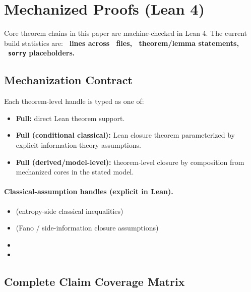 \section*{Mechanized Proofs (Lean 4)}\label{sec:lean}

Core theorem chains in this paper are machine-checked in Lean 4. The current build statistics are:
\textbf{\LeanTotalLines\ lines across \LeanTotalFiles\ files, \LeanTotalTheorems\ theorem/lemma statements, \LeanTotalSorry\ \texttt{sorry} placeholders.}

\subsection*{Mechanization Contract}

Each theorem-level handle is typed as one of:
\begin{itemize}
\item \textbf{Full:} direct Lean theorem support.
\item \textbf{Full (conditional classical):} Lean closure theorem parameterized by explicit information-theory assumptions.
\item \textbf{Full (derived/model-level):} theorem-level closure by composition from mechanized cores in the stated model.
\end{itemize}

\paragraph{Classical-assumption handles (explicit in Lean).}
\begin{itemize}
\item {} (entropy-side classical inequalities)
\item {} (Fano / side-information closure assumptions)
\item {}
\item {}
\end{itemize}

\subsection*{Complete Claim Coverage Matrix}

\begingroup
\scriptsize
